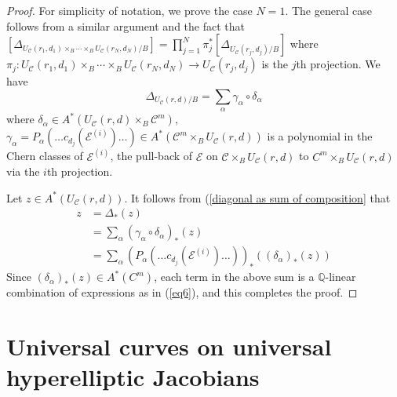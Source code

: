 \documentclass[11pt]{amsart}
\theoremstyle{definition}
\begin{document}
\begin{proof}
    For simplicity of notation, we prove the case $N=1$. 
    The general case follows from a similar argument and the fact that $[\Delta_{ U_\mathcal C(r_1,d_1) \times_B \cdots \times_B U_\mathcal  C(r_N,d_N) /B}] = \prod_{j=1}^N \pi_j ^* [\Delta_{U_{\mathcal C}(r_j,d_j)/B}]$ 
    where $\pi_j : U_\mathcal C(r_1,d_1) \times_B \cdots \times_B U_\mathcal  C(r_N,d_N)  \rightarrow U_\mathcal C (r_j,d_j) $ is the $j$th projection.     
    We have \begin{equation*}
        \Delta_{ U_\mathcal C(r,d)/B}  =\sum_{\alpha}\gamma_\alpha \circ \delta_\alpha
    \end{equation*}where $\delta_\alpha \in A^*(U_\mathcal C(r,d)\times_B \mathcal C^m)$, $\gamma_\alpha =P_\alpha \left (\dots c_{d_j}(\mathcal E^{(i)})\dots  \right )\in A^*(\mathcal C^m\times_B  U_\mathcal C(r,d))$ is a polynomial in the Chern classes of $\mathcal E^{(i)}$, the pull-back of $\mathcal E$ on $\mathcal C\times_B  U_ \mathcal C(r,d)$ to $C^{m} \times_B  U_ \mathcal C(r,d)$ via the $i$th projection. 

    Let $z\in A^*( U_ \mathcal C(r,d))$. It follows from (\ref{diagonal as sum of composition} that \begin{equation*}
\begin{aligned}
    z & = \Delta_* (z) \\ & = \sum_{\alpha} (\gamma_\alpha \circ \delta_\alpha )_* (z) \\ & = \sum_\alpha \left (P_\alpha \left (\dots c_{d_j}(\mathcal E^{(i)})\dots  \right ) \right )_* \left( (\delta_\alpha)_*(z)\right)
\end{aligned}        
    \end{equation*}Since $(\delta_\alpha)_*(z)\in A^*(C^m)$, each term in the above sum is a $\mathbb Q$-linear combination of expressions as in (\ref{eq6}), and this completes the proof.
\end{proof}


\section{Universal curves on universal hyperelliptic Jacobians}
\end{document}
